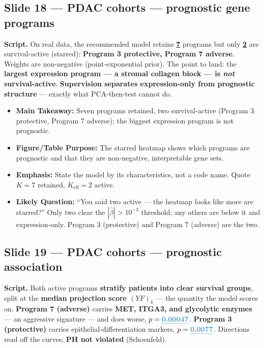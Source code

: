 \documentclass[11pt]{article}
\newcommand{\scriptlabel}{\textbf{Script. }}
\newcommand{\sectionlabel}[1]{\textbf{#1}}
\newcommand{\key}[1]{\textcolor{keyblue}{\textbf{#1}}}        %
\newcommand{\num}[1]{\textcolor{keycar}{\textbf{\uline{#1}}}} %
\begin{document}
\subsection*{Slide 18 --- PDAC cohorts --- prognostic gene programs}
\scriptlabel On real data, the recommended model retains \num{7} programs but only \num{2} are
survival-active (starred): \key{Program 3 protective, Program 7 adverse}. Weights are non-negative
(point-exponential prior). The point to land: the \key{largest expression program --- a stromal
collagen block --- is \emph{not} survival-active}. \key{Supervision separates expression-only from
prognostic structure} --- exactly what PCA-then-test cannot do.

\begin{itemize}
\item \sectionlabel{Main Takeaway:} Seven programs retained, two survival-active (Program 3
protective, Program 7 adverse); the biggest expression program is not prognostic.
\item \sectionlabel{Figure/Table Purpose:} The starred heatmap shows which programs are prognostic
and that they are non-negative, interpretable gene sets.
\item \sectionlabel{Emphasis:} State the model by its characteristics, not a code name. Quote
$K = 7$ retained, $K_{\text{eff}} = 2$ active.
\item \sectionlabel{Likely Question:} ``You said two active --- the heatmap looks like more are
starred?'' Only two clear the $|\hat\beta| > 10^{-3}$ threshold; any others are below it and
expression-only. Program 3 (protective) and Program 7 (adverse) are the two.
\end{itemize}

\subsection*{Slide 19 --- PDAC cohorts --- prognostic association}
\scriptlabel Both active programs \key{stratify patients into clear survival groups}, split at the
\key{median projection score $(YF)_k$} --- the quantity the model scores on. \key{Program 7
(adverse)} carries \key{MET, ITGA3, and glycolytic enzymes} --- an aggressive signature --- and does
worse, \key{$p = \num{0.00047}$}. \key{Program 3 (protective)} carries epithelial-differentiation
markers, $p = \num{0.0077}$. Directions read off the curves; \key{PH not violated} (Schoenfeld).
\end{document}

